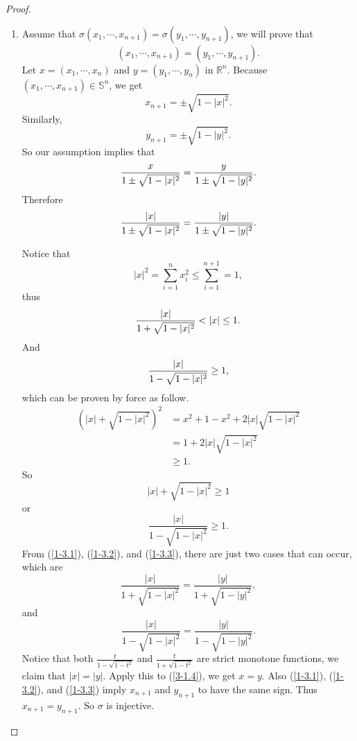 \documentclass[12pt, a4paper]{article}
\theoremstyle{plain}
\newcommand{\R}{\mathbb{R}}
\newcommand{\set}[1]{\mathbb{#1}}
\begin{document}
    \begin{proof}
        \begin{enumerate}[label=(\roman*)]
            \item Assume that $\sigma(x_1,\cdots,x_{n+1})=\sigma(y_1,\cdots,y_{n+1})$, we will prove that 
            $$(x_1,\cdots,x_{n+1})=(y_1,\cdots,y_{n+1}).$$
            Let $x=(x_1,\cdots,x_n)$ and $y=(y_1,\cdots,y_n)$ in $\R^n$. Because $(x_1,\cdots,x_{n+1})\in \set{S}^n$, we get $$x_{n+1}=\pm \sqrt{1-|x|^2}.$$
            Similarly, 
            \[
            y_{n+1}=\pm\sqrt{1-|y|^2}.
            \]
            So our assumption implies that
            \begin{equation}{\label{3-1.4}}
            \frac{x}{1\pm\sqrt{1-|x|^2}}=\frac{y}{1\pm\sqrt{1-|y|^2}}.                
            \end{equation}
            Therefore
            \begin{equation}{\label{1-3.1}}
                \frac{|x|}{1\pm\sqrt{1-|x|^2}}=\frac{|y|}{1\pm\sqrt{1-|y|^2}}.
            \end{equation}
            
            Notice that 
            \[
            |x|^2=\sum_{i=1}^{n}{x_i^2}\leq \sum_{i=1}^{n+1}=1,
            \]
            thus
            \begin{equation}{\label{1-3.2}}
            \frac{|x|}{1+\sqrt{1-|x|^2}}< |x|\leq 1.
            \end{equation}
            And 
            \begin{equation}{\label{1-3.3}}
            \frac{|x|}{1-\sqrt{1-|x|^2}}\geq 1,                
            \end{equation}
            which can be proven by force as follow.
            \begin{align*}
                (|x|+\sqrt{1-|x|^2})^2&=x^2+1-x^2+2|x|\sqrt{1-|x|^2}\\
                &=1+2|x|\sqrt{1-|x|^2}\\
                &\geq 1.
            \end{align*}
            So 
            \[
            |x|+\sqrt{1-|x|^2}\geq 1
            \]
            or 
            \[
            \frac{|x|}{1-\sqrt{1-|x|^2}}\geq 1.
            \]
            From (\ref{1-3.1}), (\ref{1-3.2}), and (\ref{1-3.3}), there are just two cases that can occur, which are
            \[
            \frac{|x|}{1+\sqrt{1-|x|^2}}=\frac{|y|}{1+\sqrt{1-|y|^2}},
            \]
            and
            \[
            \frac{|x|}{1-\sqrt{1-|x|^2}}=\frac{|y|}{1-\sqrt{1-|y|^2}}.
            \]
            Notice that both $\frac{t}{1-\sqrt{1-t^2}}$ and $\frac{t}{1+\sqrt{1-t^2}}$ are strict monotone functions, we claim that $|x|=|y|$. Apply this to (\ref{3-1.4}), we get $x=y$. Also (\ref{1-3.1}), (\ref{1-3.2}), and (\ref{1-3.3}) imply $x_{n+1}$ and $y_{n+1}$ to have the same sign. Thus $x_{n+1}=y_{n+1}$. So $\sigma$ is injective.


\end{enumerate}
\end{proof}
\end{document}
